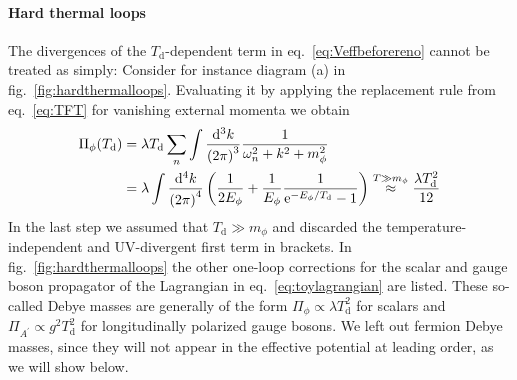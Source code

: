 \paragraph{Hard thermal loops} The divergences of the $T_\text{d}$-dependent term in eq.~\eqref{eq:Veffbeforereno} cannot be treated as simply: Consider for instance diagram (a) in fig.~\ref{fig:hardthermalloops}. Evaluating it by applying the replacement rule from eq.~\eqref{eq:TFT} for vanishing external momenta we obtain
\begin{align}
	\Pi_\phi(T_\text{d}) &= \lambda T_\text{d} \sum_n \int \frac{\mathop{}\!\mathrm{d}^3 k}{\left( 2 \pi \right)^3} \frac{1}{\omega_n^2 + k^2 + m_\phi^2} \nonumber \\ &= \lambda  \int \frac{\mathop{}\!\mathrm{d}^4 k}{\left( 2 \pi \right)^4} \left( \frac{1}{2 E_\phi} + \frac{1}{E_\phi} \frac{1}{\mathrm{e}^{-E_\phi/T_\text{d}} - 1}  \right) \overset{T \gg m_\phi}{\approx} \frac{\lambda T^2_\text{d}}{12}
\end{align}
In the last step we assumed that $T_\mathrm{d} \gg m_\phi$ and discarded the temperature-independent and \ac{UV}-divergent first term in brackets. In fig.~\ref{fig:hardthermalloops} the other one-loop corrections  for the scalar and gauge boson propagator of the Lagrangian in eq.~\eqref{eq:toylagrangian} are listed. These so-called Debye masses are generally of the form $\Pi_\phi \propto \lambda T_\text{d}^2$ for scalars and $\Pi_{A^\prime} \propto g^2 T_\text{d}^2$ for longitudinally polarized gauge bosons. We left out fermion Debye masses, since they will not appear in the effective potential at leading order, as we will show below.

